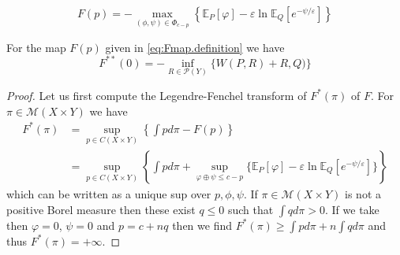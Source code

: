 \documentclass[10pt,a4paper]{amsart}
\begin{document}
\begin{equation}\label{eq:Fmap.definition}
F(p) = - \max_{(\phi, \psi)\in \Phi_{c-p}} \left\{ \mathbb{E}_P[\varphi] - \varepsilon \ln \mathbb{E}_Q[e^{-\psi/\varepsilon}]\right\}
\end{equation}

\begin{proposition}\label{prop:LTcomputation}
For the map $F(p)$ given in \eqref{eq:Fmap.definition} we have 
\begin{equation}
F^{**}(0) = - \inf_{R \in \mathcal{P}(Y)}\{ W(P,R) +\mathfrak{}R, Q)\}
\end{equation}
\end{proposition}

\begin{proof} 
Let us first compute the Legendre-Fenchel  transform of $F^*(\pi)$ of $F$.  
For $\pi \in \mathcal{M}(X \times Y)$ we have 
\begin{equation}
\begin{aligned}
F^*(\pi) & = \sup_{p\in C(X \times Y)} \left\{\int p d\pi - F(p)\right\}  \\
&= \sup_{p \in C(X \times Y)} \left\{ 
\int p d\pi  + \sup_{\varphi \oplus \psi\le c-p} 
\{ 
\mathbb{E}_P[\varphi] - \varepsilon \ln \mathbb{E}_Q[e^{-\psi/\varepsilon}]
\} 
\right\} 
\end{aligned}
\end{equation}
which can be written as a unique sup over $p, \phi, \psi$.  If $\pi \in \mathcal{M}(X \times Y)$ is not a positive Borel measure then these exist $q\le 0$ such that $\int q d\pi >0 $.   If we take then $\varphi=0$, $\psi=0$ and $p = c + nq$ then we find 
$F^*(\pi) \ge \int p d\pi + n \int q d\pi$ and thus $F^*(\pi)=+\infty$.  


\end{proof}
\end{document}
